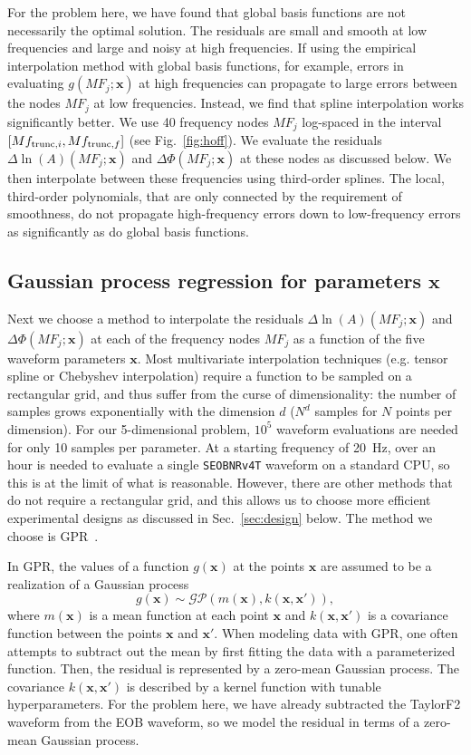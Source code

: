 \documentclass[prd,aps,letter,twocolumn,floatfix,notitlepage,nofootinbib]{revtex4-1}
\def\bx{\mathbf{x}}
\begin{document}
For the problem here, we have found that global basis functions are not necessarily the optimal solution. The residuals are small and smooth at low frequencies and large and noisy at high frequencies. If using the empirical interpolation method with global basis functions, for example, errors in evaluating $g(MF_j;\bx)$ at high frequencies can propagate to large errors between the nodes $MF_j$ at low frequencies. Instead, we find that spline interpolation works significantly better. We use 40 frequency nodes $MF_j$ log-spaced in the interval $[Mf_{{\rm trunc}, i}, Mf_{{\rm trunc}, f}]$ (see Fig.~\ref{fig:hoff}). We evaluate the residuals $\Delta\ln(A)(MF_j; \bx)$ and $\Delta\Phi(MF_j; \bx)$ at these nodes as discussed below. We then interpolate between these frequencies using third-order splines. The local, third-order polynomials, that are only connected by the requirement of smoothness, do not propagate high-frequency errors down to low-frequency errors as significantly as do global basis functions.


\subsection{Gaussian process regression for parameters $\bx$}

Next we choose a method to interpolate the residuals $\Delta\ln(A)(MF_j; \bx)$ and $\Delta\Phi(MF_j; \bx)$ at each of the frequency nodes $MF_j$ as a function of the five waveform parameters $\bx$. Most multivariate interpolation techniques (e.g. tensor spline or Chebyshev interpolation) require a function to be sampled on a rectangular grid, and thus suffer from the curse of dimensionality: the number of samples grows exponentially with the dimension $d$ ($N^d$ samples for $N$ points per dimension). For our 5-dimensional problem, $10^5$ waveform evaluations are needed for only 10 samples per parameter. At a starting frequency of 20~Hz, over an hour is needed to evaluate a single \texttt{SEOBNRv4T} waveform on a standard CPU, so this is at the limit of what is reasonable. However, there are other methods that do not require a rectangular grid, and this allows us to choose more efficient experimental designs as discussed in Sec.~\ref{sec:design} below. The method we choose is GPR~\cite{RasmussenWilliams2006}.

In GPR, the values of a function $g(\bx)$ at the points $\bx$ are assumed to be a realization of a Gaussian process
\begin{equation}
g(\bx) \sim \mathcal{GP}(m(\bx), k(\bx, \bx')),
\end{equation}
where $m(\bx)$ is a mean function at each point $\bx$ and $k(\bx, \bx')$ is a covariance function between the points $\bx$ and $\bx'$.
When modeling data with GPR, one often attempts to subtract out the mean by first fitting the data with a parameterized function. Then, the residual is represented by a zero-mean Gaussian process. The covariance $k(\bx, \bx')$ is described by a kernel function with tunable hyperparameters. For the problem here, we have already subtracted the TaylorF2 waveform from the EOB waveform, so we model the residual in terms of a zero-mean Gaussian process. 
\end{document}
